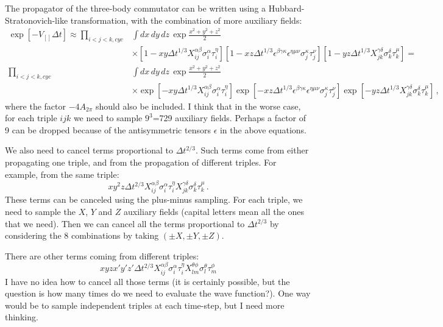\documentclass{article}
\begin{document}
The propagator of the three-body commutator can be written using a Hubbard-Stratonovich-like 
transformation, with the combination of more auxiliary fields:
\begin{align}
\exp\left[-V_{[]}\Delta t\right]\approx
\prod_{i<j<k,cyc}&\int dx\,dy\,dz\,\exp\frac{x^2+y^2+z^2}{2} \\
&\times\left[1-xy\Delta t^{1/3}X_{ij}^{\alpha\beta}\sigma_i^\alpha\tau_i^\eta\right] 
\left[1-xz\Delta t^{1/3}\epsilon^{\beta\gamma\kappa}\epsilon^{\eta\mu\nu}\sigma_j^\kappa\tau_j^\nu\right] 
\left[1-yz\Delta t^{1/3}X_{jk}^{\gamma\delta}\sigma_k^\delta\tau_k^\mu\right]= \\
\prod_{i<j<k,cyc}&\int dx\,dy\,dz\,\exp\frac{x^2+y^2+z^2}{2} \\
&\times\exp\left[-xy\Delta t^{1/3}X_{ij}^{\alpha\beta}\sigma_i^\alpha\tau_i^\eta\right] 
\exp\left[-xz\Delta t^{1/3}\epsilon^{\beta\gamma\kappa}\epsilon^{\eta\mu\nu}\sigma_j^\kappa\tau_j^\nu\right] 
\exp\left[-yz\Delta t^{1/3}X_{jk}^{\gamma\delta}\sigma_k^\delta\tau_k^\mu\right] \,,
\end{align}
where the factor $-4A_{2\pi}$ should also be included. 
I think that in the worse case, for each triple $ijk$ we need to sample $9^3$=729 auxiliary fields.
Perhaps a factor of 9 can be dropped because of the antisymmetric tensors $\epsilon$ in the above
equations.

We also need to cancel terms proportional to $\Delta t^{2/3}$. Such terms come from either
propagating one triple, and from the propagation of different triples. For example,
from the same triple:
\begin{equation}
xy^2z\Delta t^{2/3} X_{ij}^{\alpha\beta}\sigma_i^\alpha\tau_i^\eta
X_{jk}^{\gamma\delta}\sigma_k^\delta\tau_k^\mu \,.
\end{equation}
These terms can be canceled using the plus-minus sampling. For each triple, we need
to sample the $X$, $Y$ and $Z$ auxiliary fields (capital letters mean all the ones
that we need). Then we can cancel all the terms proportional to $\Delta t^{2/3}$
by considering the 8 combinations by taking $(\pm X,\pm Y, \pm Z)$.

There are other terms coming from different triples:
\begin{equation}
xyzx'y'z' \Delta t^{2/3}X_{ij}^{\alpha\beta}\sigma_i^\alpha\tau_i^\eta
X_{lm}^{\theta\phi}\sigma_l^\theta\tau_m^\phi
\end{equation}
I have no idea how to cancel all those terms (it is certainly possible, but the question is
how many times do we need to evaluate the wave function?).
One way would be to sample independent
triples at each time-step, but I need more thinking.
\end{document}
